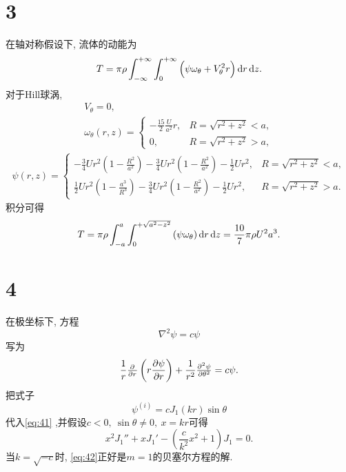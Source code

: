 \documentclass[12pt]{article}
\begin{document}
\section{3}

在轴对称假设下, 流体的动能为
\begin{equation}
	T = \pi \rho \int^{+\infty}_{-\infty} \int^{+\infty}_{0} \left(\psi \omega_\theta + V^2_\theta r \right)\dif r \dif z.
\end{equation}
对于Hill球涡, 
\begin{gather}
	V_\theta = 0,\\
	\omega_\theta (r,z)= \begin{cases}
		-\frac{15}{2}\frac{U}{a^2}r, &R = \sqrt{r^2+z^2}<a,\\
		0, &R = \sqrt{r^2+z^2}>a,
	\end{cases}
\end{gather}
\begin{gather}
	\psi (r,z)= \begin{cases}
		-\frac{3}{4}Ur^2\left(1-\frac{R^2}{a^2}\right)-\frac{3}{4}Ur^2\left(1-\frac{R^2}{a^2}\right)-\frac{1}{2}Ur^2, &R = \sqrt{r^2+z^2}<a,\\
		\frac{1}{2}Ur^2\left(1-\frac{a^3}{R^3}\right) -\frac{3}{4}Ur^2\left(1-\frac{R^2}{a^2}\right)-\frac{1}{2}Ur^2, &R = \sqrt{r^2+z^2}>a.
	\end{cases}
\end{gather}
积分可得
\begin{equation}
	T = \pi \rho \int^{a}_{-a} \int^{+\sqrt{a^2-z^2}}_{0} \left(\psi \omega_\theta \right)\dif r \dif z = \frac{10}{7}\pi \rho U^2 a^3.
\end{equation}

\section{4}

在极坐标下, 方程
\begin{equation}
	\nabla^{2} \psi=c \psi
\end{equation}
写为
\begin{equation}
	\frac{1}{r} \pd{}{r}\left(r\frac{\partial \psi}{\partial r}\right) + \frac{1}{r^2} \pd[2]{\psi}{\theta} = c\psi.
	\label{eq:41}
\end{equation}
把式子
\begin{equation}
	\psi^{(i)}=c J_{1}(k r) \sin \theta
	\label{eq:42}
\end{equation}
代入\cref{eq:41} ,并假设$c<0,\ \sin \theta \not=0,\ x=kr$可得
\begin{equation}
	x^2 J_1'' + xJ_1'-\left(\frac{c}{k^2}x^2 + 1 \right)J_1=0.
\end{equation}
当$k=\sqrt{-c}$时, \cref{eq:42}正好是$m=1$的贝塞尔方程的解. 
\end{document}
